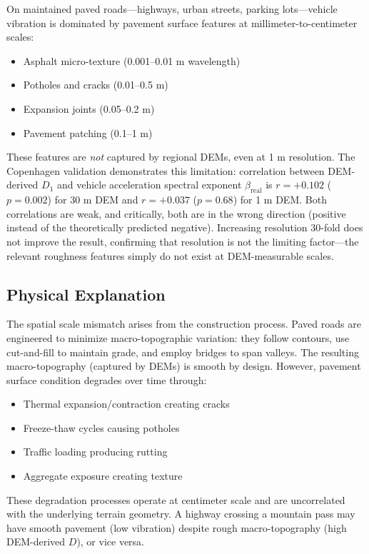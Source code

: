 \documentclass[11pt]{article}
\begin{document}
On maintained paved roads---highways, urban streets, parking lots---vehicle vibration is dominated by pavement surface features at millimeter-to-centimeter scales:
\begin{itemize}
\item Asphalt micro-texture (0.001--0.01 m wavelength)
\item Potholes and cracks (0.01--0.5 m)
\item Expansion joints (0.05--0.2 m)
\item Pavement patching (0.1--1 m)
\end{itemize}

These features are \textit{not} captured by regional DEMs, even at 1 m resolution. The Copenhagen validation demonstrates this limitation: correlation between DEM-derived $D_1$ and vehicle acceleration spectral exponent $\beta_{\text{real}}$ is $r = +0.102$ ($p = 0.002$) for 30 m DEM and $r = +0.037$ ($p = 0.68$) for 1 m DEM. Both correlations are weak, and critically, both are in the wrong direction (positive instead of the theoretically predicted negative). Increasing resolution 30-fold does not improve the result, confirming that resolution is not the limiting factor---the relevant roughness features simply do not exist at DEM-measurable scales.

\subsection{Physical Explanation}

The spatial scale mismatch arises from the construction process. Paved roads are engineered to minimize macro-topographic variation: they follow contours, use cut-and-fill to maintain grade, and employ bridges to span valleys. The resulting macro-topography (captured by DEMs) is smooth by design. However, pavement surface condition degrades over time through:
\begin{itemize}
\item Thermal expansion/contraction creating cracks
\item Freeze-thaw cycles causing potholes
\item Traffic loading producing rutting
\item Aggregate exposure creating texture
\end{itemize}

These degradation processes operate at centimeter scale and are uncorrelated with the underlying terrain geometry. A highway crossing a mountain pass may have smooth pavement (low vibration) despite rough macro-topography (high DEM-derived $D$), or vice versa.
\end{document}
